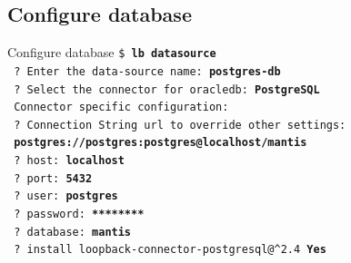 \documentclass[11pt]{beamer}
\begin{document}
\subsection{Configure database}
\begin{frame}{Configure database}
\texttt{\$ \textbf{lb datasource}}\\
\texttt{    ? Enter the data-source name: \textbf{postgres-db}}\\
\texttt{    ? Select the connector for oracledb: \textbf{PostgreSQL}}\\
\texttt{    Connector specific configuration:}\\
\texttt{    ? Connection String url to override other settings:}\\
\texttt{    	\textbf{postgres://postgres:postgres@localhost/mantis}}\\
\texttt{    ? host: \textbf{localhost}}\\
\texttt{    ? port: \textbf{5432}}\\
\texttt{    ? user: \textbf{postgres}}\\
\texttt{    ? password: \textbf{********}}\\
\texttt{    ? database: \textbf{mantis}}\\
\texttt{    ? install loopback-connector-postgresql@\^{}2.4 \textbf{Yes}}
\end{frame}
\end{document}
